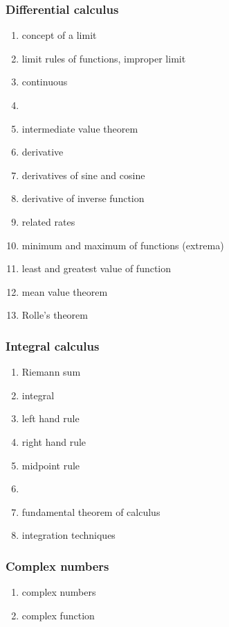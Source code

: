 \documentclass[12pt]{article}
\begin{document}
\subsubsection*{Differential calculus}
\begin{enumerate}
\item concept of a limit
\item limit rules of functions, improper limit
\item continuous
\item {}
\item intermediate value theorem
\item derivative
\item derivatives of sine and cosine
\item derivative of inverse function
\item related rates
\item minimum and maximum of functions (extrema)
\item least and greatest value of function
\item mean value theorem
\item Rolle's theorem
\end{enumerate}

\subsubsection*{Integral calculus}
\begin{enumerate}
\item Riemann sum
\item integral
\item left hand rule
\item right hand rule
\item midpoint rule
\item {}
\item fundamental theorem of calculus
\item integration techniques
\end{enumerate}

\subsubsection*{Complex numbers}
\begin{enumerate}
\item complex numbers
\item complex function
\end{enumerate}
\end{document}
